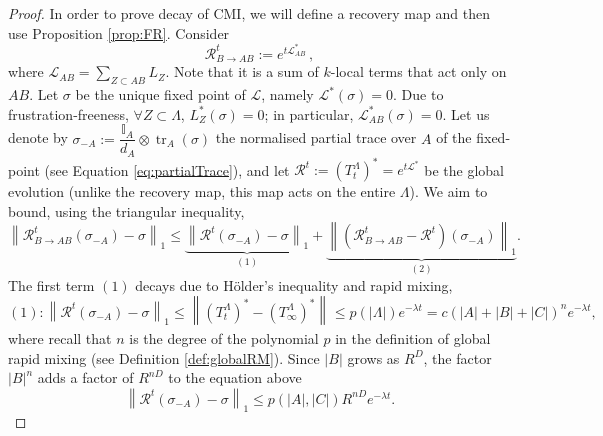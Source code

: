 \documentclass[11pt]{article}
\numberwithin{equation}{section}
\numberwithin{figure}{section}
\numberwithin{table}{section}
\theoremstyle{definition}
\theoremstyle{plain}
\theoremstyle{remark}
\newcommand{\Id}{\mathbb{I}}
\newcommand{\RR}{\mathcal{R}}
\newcommand{\Li}{\mathcal{L}}
\newcommand{\recovery}{\mathcal{R}_{B\to AB}^t}
\newcommand{\La}{\Lambda}
\newcommand{\T}{T^\Lambda}
\newcommand{\normm}[2]{\left\lVert#1\right\rVert_{#2}}
\newcommand{\tr}{\operatorname{tr}}
\newcommand{\abs}[1]{\left \vert#1\right\vert}
\begin{document}
\begin{proof}
    In order to prove decay of CMI, we will define a recovery map and then use Proposition \ref{prop:FR}. Consider
    \begin{equation}
        \recovery:=e^{t\Li_{AB}^*} \, ,
    \end{equation}
    where $\Li_{AB}=\sum_{Z\subset AB}L_Z$. Note that it is a sum of $k$-local terms that act only on $AB$. Let $\sigma$ be the unique fixed point of $\Li$, namely $\Li^*(\sigma)=0$. Due to frustration-freeness, $\forall Z\subset \La$, $L_Z^*(\sigma)=0$; in particular, $\Li_{AB}^*(\sigma)=0$. Let us denote by $\sigma_{-A}:=\dfrac{\Id_A}{d_A}\otimes\tr_A(\sigma)$ the normalised partial trace over $A$ of the fixed-point (see Equation \eqref{eq:partialTrace}), and let $ \RR^t:=(T^\Lambda_t)^*=e^{t\Li^*} $
    be the global evolution (unlike the recovery map, this map acts on the entire $\La$). We aim to bound, using the triangular inequality,
    \begin{equation}
        \normm{\recovery (\sigma_{-A})-\sigma}{1}\leq \underbrace{\normm{\RR^t(\sigma_{-A})-\sigma}{1}}_{(1)}+\underbrace{\normm{(\recovery-\RR^t)(\sigma_{-A})}{1}}_{(2)}.
        \label{eq:CMItriangularInequality}
    \end{equation}
    The first term $(1)$ decays due to Hölder's inequality and rapid mixing,
    \begin{equation}
        (1):\normm{\RR^t(\sigma_{-A})-\sigma}{1}\leq\normm{(T^\Lambda_t)^*-(T^\Lambda_\infty)^*}{}\leq p(\abs{\La})e^{-\lambda t}=c(\abs{A}+\abs{B}+\abs{C})^ne^{-\lambda t},
    \end{equation}
    where recall that $n$ is the degree of the polynomial $p$ in the definition of global rapid mixing (see Definition \ref{def:globalRM}). Since $\abs{B}$ grows as $R^D$, the factor $\abs{B}^n$ adds a factor of $R^{nD}$ to the equation above
    \begin{equation}
        \normm{\RR^t(\sigma_{-A})-\sigma}{1}\leq p(\abs{A},\abs{C}) R^{nD}e^{-\lambda t}.
    \end{equation}


\end{proof}
\end{document}
